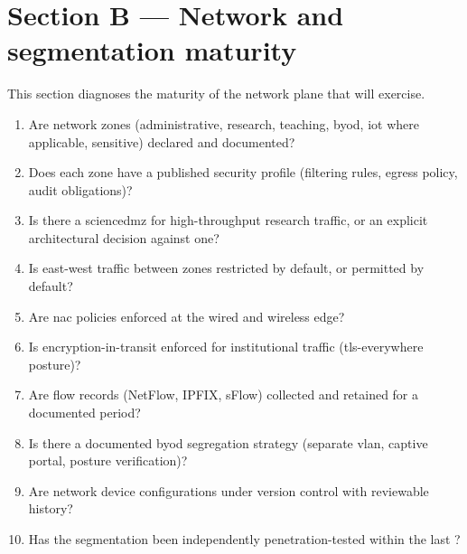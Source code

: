 \section{Section B --- Network and segmentation maturity}
\label{sec:sa-network}

This section diagnoses the maturity of the network plane that
 will
exercise.

\begin{enumerate}[leftmargin=2em,nosep,label=B\arabic*.]
  \item Are network zones (administrative, research, teaching,
  \gls{byod}, \gls{iot} where applicable, sensitive) declared and
  documented?

  \item Does each zone have a published security profile (filtering
  rules, egress policy, audit obligations)?

  \item Is there a \gls{sciencedmz} for high-throughput research
  traffic, or an explicit architectural decision against one?

  \item Is east-west traffic between zones restricted by default, or
  permitted by default?

  \item Are \gls{nac} policies enforced at the wired and wireless
  edge?

  \item Is encryption-in-transit enforced for institutional traffic
  (\gls{tls}-everywhere posture)?

  \item Are flow records (NetFlow, IPFIX, sFlow) collected and
  retained for a documented period?

  \item Is there a documented \gls{byod} segregation strategy
  (separate \gls{vlan}, captive portal, posture verification)?

  \item Are network device configurations under version control with
  reviewable history?

  \item Has the segmentation been independently penetration-tested
  within the last ?
\end{enumerate}

